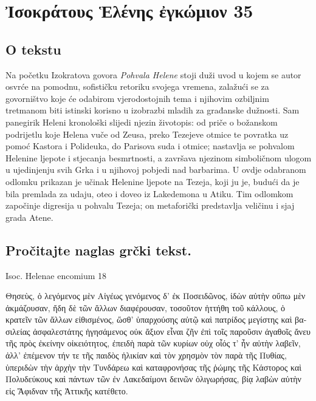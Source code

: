 \documentclass[a4paper,12pt,twoside]{report}
\begin{document}
\chapter[Ἰσοκράτους Ἑλένης ἐγκώμιον]{\textgreek[variant=ancient]{Ἰσοκράτους Ἑλένης ἐγκώμιον} 35}

\section*{O tekstu}

Na početku Izokratova govora \textit{Pohvala Helene} stoji duži uvod u kojem se autor osvrće na pomodnu, sofističku retoriku svojega vremena, zalažući se za govorništvo koje će odabirom vjerodostojnih tema i njihovim ozbiljnim tretmanom biti istinski korisno u izobrazbi mladih za građanske dužnosti. Sam panegirik Heleni kronološki slijedi njezin životopis: od priče o božanskom podrijetlu koje Helena vuče od Zeusa, preko Tezejeve otmice te povratka uz pomoć Kastora i Polideuka, do Parisova suda i otmice; nastavlja se pohvalom Helenine ljepote i stjecanja besmrtnosti, a završava njezinom simboličnom ulogom u ujedinjenju svih Grka i u njihovoj pobjedi nad barbarima. U ovdje odabranom odlomku prikazan je učinak Helenine ljepote na Tezeja, koji ju je, budući da je bila premlada za udaju, oteo i doveo iz Lakedemona u Atiku. Tim odlomkom započinje digresija u pohvalu Tezeja; on metaforički predstavlja veličinu i sjaj grada Atene.


\section*{Pročitajte naglas grčki tekst.}
Isoc. Helenae encomium 18

\medskip

{\large
\begin{greek}
\noindent Θησεὺς, ὁ λεγόμενος μὲν Αἰγέως γενόμενος δ' ἐκ Ποσειδῶνος, ἰδὼν αὐτὴν οὔπω μὲν ἀκμάζουσαν, ἤδη δὲ τῶν ἄλλων διαφέρουσαν, τοσοῦτον ἡττήθη τοῦ κάλλους, ὁ κρατεῖν τῶν ἄλλων εἰθισμένος, ὥσθ' ὑπαρχούσης αὐτῷ καὶ πατρίδος μεγίστης καὶ βασιλείας ἀσφαλεστάτης ἡγησάμενος οὐκ ἄξιον εἶναι ζῆν ἐπὶ τοῖς παροῦσιν ἀγαθοῖς ἄνευ τῆς πρὸς ἐκείνην οἰκειότητος, ἐπειδὴ παρὰ τῶν κυρίων οὐχ οἷός τ' ἦν αὐτὴν λαβεῖν, ἀλλ' ἐπέμενον τήν τε τῆς παιδὸς ἡλικίαν καὶ τὸν χρησμὸν τὸν παρὰ τῆς Πυθίας, ὑπεριδὼν τὴν ἀρχὴν τὴν Τυνδάρεω καὶ καταφρονήσας τῆς ῥώμης τῆς Κάστορος καὶ Πολυδεύκους καὶ πάντων τῶν ἐν Λακεδαίμονι δεινῶν ὀλιγωρήσας, βίᾳ λαβὼν αὐτὴν εἰς Ἄφιδναν τῆς Ἀττικῆς κατέθετο.

\end{greek}

}
\end{document}
